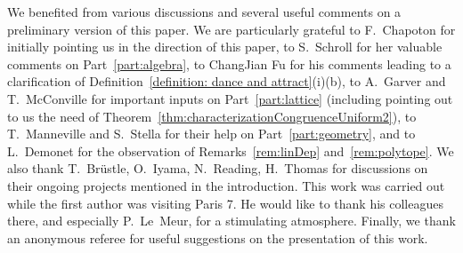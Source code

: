 \documentclass{amsart}
\theoremstyle{definition}
\begin{document}
We benefited from various discussions and several useful comments on a preliminary version of this paper.
We are particularly grateful to F.~Chapoton for initially pointing us in the direction of this paper, to S.~Schroll for her valuable comments on Part~\ref{part:algebra}, to ChangJian Fu for his comments leading to a clarification of Definition~\ref{definition: dance and attract}(i)(b), to A.~Garver and T.~McConville for important inputs on Part~\ref{part:lattice} (including pointing out to us the need of Theorem~\ref{thm:characterizationCongruenceUniform2}), to T.~Manneville and S.~Stella for their help on Part~\ref{part:geometry}, and to L.~Demonet for the observation of Remarks~\ref{rem:linDep} and~\ref{rem:polytope}.
We also thank T.~Br\"ustle, O.~Iyama, N.~Reading, H.~Thomas for discussions on their ongoing projects mentioned in the introduction.
This work was carried out while the first author was visiting Paris 7. He would like to thank his colleagues there, and especially \mbox{P.~Le Meur}, for a stimulating atmosphere.
Finally, we thank an anonymous referee for useful suggestions on the presentation of this work.




\label{sec:biblio}
\end{document}
